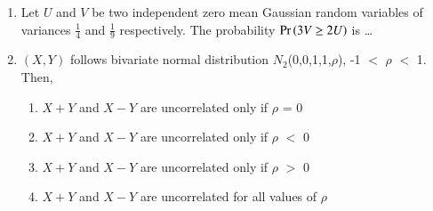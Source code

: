 \renewcommand{\theequation}{\theenumi}
\renewcommand{\thefigure}{\theenumi}
\renewcommand{\thetable}{\theenumi}
\begin{enumerate}[label=\thesection.\arabic*.,ref=\thesection.\theenumi]

\item Let $U$ and $V$ be two independent zero mean Gaussian random variables of variances $\frac{1}{4}$ and $\frac{1}{9}$ respectively. The probability $\Pr\left(3V \geq 2U\right)$ is \dots
\\
\solution

%
\item $(X,Y)$ follows bivariate normal distribution $N_2$(0,0,1,1,$\rho$),  -1 $<$ $\rho$ $<$ 1. Then,
\begin{enumerate}
    \item $X+Y$ and $X-Y$ are uncorrelated only if $\rho$ = 0
    \item $X+Y$ and $X-Y$ are uncorrelated only if $\rho$ $<$ 0
    \item $X+Y$ and $X-Y$ are uncorrelated only if $\rho$ $>$ 0
    \item $X+Y$ and $X-Y$ are uncorrelated for all values of $\rho$
\end{enumerate}
\solution

\end{enumerate}